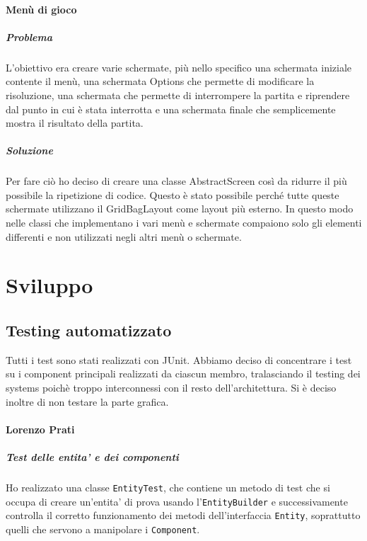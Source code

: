 \documentclass[a4paper,12pt]{report}
\begin{document}
\subsubsection*{Menù di gioco}
\paragraph*{Problema}
	L'obiettivo era creare varie schermate, più nello specifico una schermata iniziale contente il menù, una schermata Options che permette di modificare la risoluzione, una schermata che permette di interrompere la partita e riprendere dal punto in cui è stata interrotta e una schermata finale che semplicemente mostra il risultato della partita.
\paragraph*{Soluzione}
	Per fare ciò ho deciso di creare una classe AbstractScreen così da ridurre il più possibile la ripetizione di codice. Questo è stato possibile perché tutte queste schermate utilizzano il GridBagLayout come layout più esterno.
	In questo modo nelle classi che implementano i vari menù e schermate compaiono solo gli elementi differenti e non utilizzati negli altri menù o schermate.

\chapter{Sviluppo}

\section{Testing automatizzato}

Tutti i test sono stati realizzati con JUnit. Abbiamo deciso di concentrare i test su i component principali realizzati da ciascun membro, tralasciando il testing dei systems poichè troppo interconnessi con il resto dell'architettura.
Si è deciso inoltre di non testare la parte grafica.

\subsubsection*{Lorenzo Prati}

\paragraph*{Test delle entita' e dei componenti}
Ho realizzato una classe \texttt{EntityTest}, che contiene un metodo di test che si occupa di creare un'entita' di prova usando l'\texttt{EntityBuilder} e successivamente controlla il corretto funzionamento dei metodi dell'interfaccia \texttt{Entity}, soprattutto quelli che servono a manipolare i \texttt{Component}.
\end{document}
